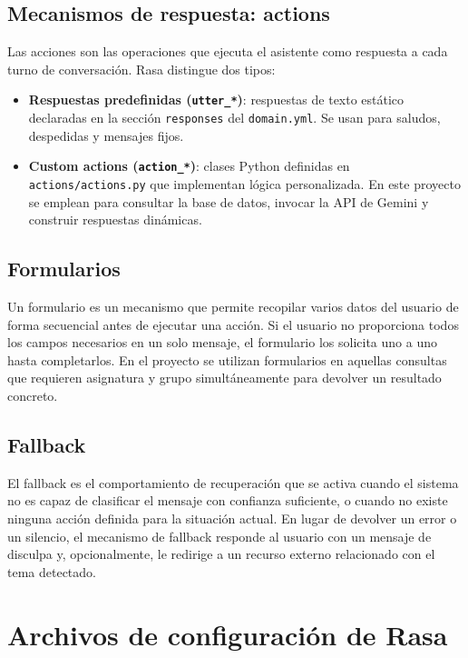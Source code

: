 \subsection{Mecanismos de respuesta: actions}

Las acciones son las operaciones que ejecuta el asistente como respuesta a cada turno de conversación. Rasa distingue dos tipos:

\begin{itemize}
    \item \textbf{Respuestas predefinidas (\texttt{utter\_*})}: respuestas de texto estático declaradas en la sección \texttt{responses} del \texttt{domain.yml}. Se usan para saludos, despedidas y mensajes fijos.
    \item \textbf{Custom actions (\texttt{action\_*})}: clases Python definidas en \texttt{actions/actions.py} que implementan lógica personalizada. En este proyecto se emplean para consultar la base de datos, invocar la API de Gemini y construir respuestas dinámicas.
\end{itemize}

\subsection{Formularios}

Un formulario es un mecanismo que permite recopilar varios datos del usuario de forma secuencial antes de ejecutar una acción. Si el usuario no proporciona todos los campos necesarios en un solo mensaje, el formulario los solicita uno a uno hasta completarlos. En el proyecto se utilizan formularios en aquellas consultas que requieren asignatura y grupo simultáneamente para devolver un resultado concreto.

\subsection{Fallback}

El fallback es el comportamiento de recuperación que se activa cuando el sistema no es capaz de clasificar el mensaje con confianza suficiente, o cuando no existe ninguna acción definida para la situación actual. En lugar de devolver un error o un silencio, el mecanismo de fallback responde al usuario con un mensaje de disculpa y, opcionalmente, le redirige a un recurso externo relacionado con el tema detectado.

\section{Archivos de configuración de Rasa}
\label{sec:archivos-rasa}

